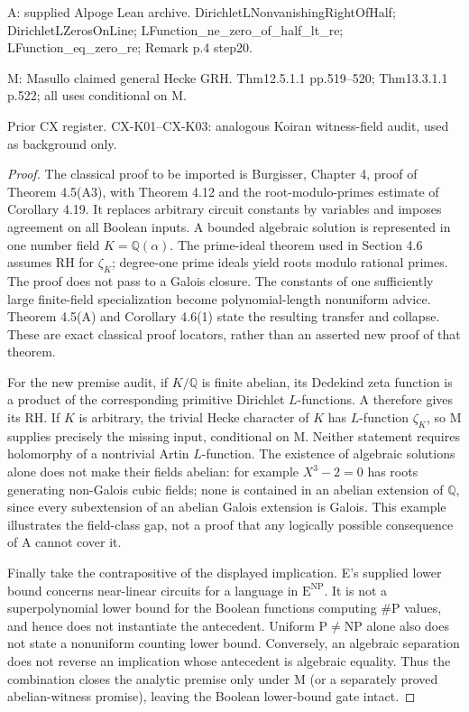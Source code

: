 A: supplied Alpoge Lean archive. DirichletLNonvanishingRightOfHalf; DirichletLZerosOnLine; LFunction\_ne\_zero\_of\_half\_lt\_re; LFunction\_eq\_zero\_re; Remark p.4 step20.

M: Masullo claimed general Hecke GRH. Thm12.5.1.1 pp.519--520; Thm13.3.1.1 p.522; all uses conditional on M.

Prior CX register. CX-K01--CX-K03: analogous Koiran witness-field audit, used as background only.

\begin{proof}
The classical proof to be imported is Burgisser, Chapter 4, proof of Theorem 4.5(A3), with Theorem 4.12 and the root-modulo-primes estimate of Corollary 4.19. It replaces arbitrary circuit constants by variables and imposes agreement on all Boolean inputs. A bounded algebraic solution is represented in one number field $K=\mathbb Q(\alpha)$. The prime-ideal theorem used in Section 4.6 assumes RH for $\zeta_K$; degree-one prime ideals yield roots modulo rational primes. The proof does not pass to a Galois closure. The constants of one sufficiently large finite-field specialization become polynomial-length nonuniform advice. Theorem 4.5(A) and Corollary 4.6(1) state the resulting transfer and collapse. These are exact classical proof locators, rather than an asserted new proof of that theorem.

For the new premise audit, if $K/\mathbb Q$ is finite abelian, its Dedekind zeta function is a product of the corresponding primitive Dirichlet $L$-functions. A therefore gives its RH. If $K$ is arbitrary, the trivial Hecke character of $K$ has $L$-function $\zeta_K$, so M supplies precisely the missing input, conditional on M. Neither statement requires holomorphy of a nontrivial Artin $L$-function. The existence of algebraic solutions alone does not make their fields abelian: for example $X^3-2=0$ has roots generating non-Galois cubic fields; none is contained in an abelian extension of $\mathbb Q$, since every subextension of an abelian Galois extension is Galois. This example illustrates the field-class gap, not a proof that any logically possible consequence of A cannot cover it.

Finally take the contrapositive of the displayed implication. E's supplied lower bound concerns near-linear circuits for a language in $\mathrm E^{\mathrm{NP}}$. It is not a superpolynomial lower bound for the Boolean functions computing $\#\mathrm P$ values, and hence does not instantiate the antecedent. Uniform $\mathrm P\ne\mathrm{NP}$ alone also does not state a nonuniform counting lower bound. Conversely, an algebraic separation does not reverse an implication whose antecedent is algebraic equality. Thus the combination closes the analytic premise only under M (or a separately proved abelian-witness promise), leaving the Boolean lower-bound gate intact.
\end{proof}
